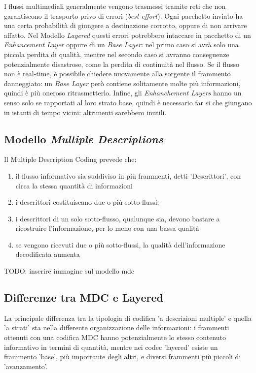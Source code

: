 I flussi multimediali generalmente vengono trasmessi tramite reti che non
garantiscono il trasporto privo di errori (\emph{best effort}). Ogni pacchetto
inviato ha una certa probabilità di giungere a destinazione corrotto, oppure di
non arrivare affatto. Nel Modello \emph{Layered} questi errori potrebbero
intaccare in pacchetto di un \emph{Enhancement Layer} oppure di un \emph{Base
Layer}: nel primo caso si avrà solo una piccola perdita di qualità, mentre nel
secondo caso si avranno conseguenze potenzialmente disastrose, come la perdita
di continuità nel flusso. Se il flusso non è real-time, è possibile chiedere
nuovamente alla sorgente il frammento danneggiato: un \emph{Base Layer} però
contiene solitamente molte più informazioni, quindi è più oneroso
ritrasmetterlo.
Infine, gli \emph{Enhanchement Layers} hanno un senso solo se rapportati al
loro strato base, quindi è necessario far si che giungano in istanti di
tempo vicini: altrimenti sarebbero inutili.



\subsection{Modello \emph{Multiple Descriptions}}

Il Multiple Description Coding prevede che:
\begin{enumerate}
\item il flusso informativo sia suddiviso in più frammenti, detti 'Descrittori', con circa la stessa quantità di informazioni
\item i descrittori costituiscano due o più sotto-flussi;
\item i descrittori di un solo sotto-flusso, qualunque sia, devono bastare a ricostruire l'informazione, per lo meno con una bassa qualità
\item se vengono ricevuti due o più sotto-flussi, la qualità dell'informazione decodificata aumenta 
\end{enumerate}

TODO: inserire immagine sul modello mdc

\subsection{Differenze tra MDC e Layered}

La principale differenza tra la tipologia di codifica 'a descrizioni multiple' e
quella 'a strati' sta nella differente organizzazione delle informazioni: i
frammenti ottenuti con una codifica MDC hanno potenzialmente lo stesso contenuto
informativo in termini di quantità, mentre nei codec 'layered' esiste un
frammento 'base', più importante degli altri, e diversi frammenti più piccoli di
'avanzamento'.







